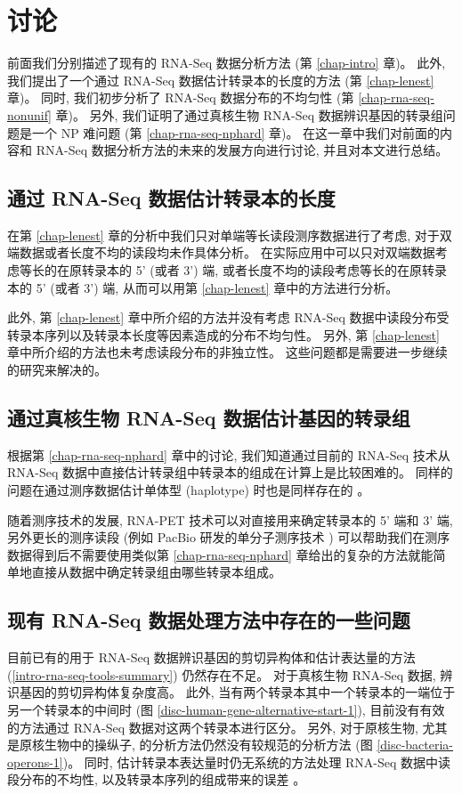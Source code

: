 \chapter{讨论}
前面我们分别描述了现有的 RNA-Seq 数据分析方法 (第 \ref{chap-intro} 章)。 
此外, 我们提出了一个通过 RNA-Seq 数据估计转录本的长度的方法 (第 \ref{chap-lenest} 章)。  
同时, 我们初步分析了 RNA-Seq 数据分布的不均匀性 (第 \ref{chap-rna-seq-nonunif} 章)。  
另外, 我们证明了通过真核生物 RNA-Seq 数据辨识基因的转录组问题是一个 NP 难问题 (第 \ref{chap-rna-seq-nphard} 章)。   
在这一章中我们对前面的内容和 RNA-Seq 数据分析方法的未来的发展方向进行讨论, 
并且对本文进行总结。 

\section{通过 RNA-Seq 数据估计转录本的长度}
在第 \ref{chap-lenest} 章的分析中我们只对单端等长读段测序数据进行了考虑, 
对于双端数据或者长度不均的读段均未作具体分析。 
在实际应用中可以只对双端数据考虑等长的在原转录本的 5' (或者 3') 端, 
或者长度不均的读段考虑等长的在原转录本的 5' (或者 3') 端, 
从而可以用第 \ref{chap-lenest} 章中的方法进行分析。 

此外, 第 \ref{chap-lenest} 章中所介绍的方法并没有考虑 RNA-Seq 
数据中读段分布受转录本序列以及转录本长度等因素造成的分布不均匀性。 
另外, 第 \ref{chap-lenest} 章中所介绍的方法也未考虑读段分布的非独立性。 
这些问题都是需要进一步继续的研究来解决的。 

\section{通过真核生物 RNA-Seq 数据估计基因的转录组}
根据第 \ref{chap-rna-seq-nphard} 章中的讨论, 
我们知道通过目前的 RNA-Seq 技术从 RNA-Seq 数据中直接估计转录组中转录本的组成在计算上是比较困难的。 
同样的问题在通过测序数据估计单体型 (haplotype) 
\cite{Li_Kim_Waterman_2004, Xing_Jordan_Sharan_2007} 时也是同样存在的 \cite{1668028}。 

随着测序技术的发展, 
RNA-PET \cite{Fullwood01042009} 技术可以对直接用来确定转录本的 5' 端和 3' 端, 
另外更长的测序读段 (例如 PacBio 研发的单分子测序技术 \cite{hybrid.rna.seq.2012})
可以帮助我们在测序数据得到后不需要使用类似第 \ref{chap-rna-seq-nphard} 
章给出的复杂的方法就能简单地直接从数据中确定转录组由哪些转录本组成。 

\section{现有 RNA-Seq 数据处理方法中存在的一些问题}
目前已有的用于 RNA-Seq 数据辨识基因的剪切异构体和估计表达量的方法 
(\ref{intro-rna-seq-tools-summary}) 仍然存在不足。 
对于真核生物 RNA-Seq 数据, 辨识基因的剪切异构体复杂度高。
此外, 当有两个转录本其中一个转录本的一端位于另一个转录本的中间时 
(图 \ref{disc-human-gene-alternative-start-1}), 
目前没有有效的方法通过 RNA-Seq 数据对这两个转录本进行区分。
另外, 对于原核生物, 尤其是原核生物中的操纵子, 的分析方法仍然没有较规范的分析方法 
\cite{mcclure2013computational} (图 \ref{disc-bacteria-operons-1})。
同时, 估计转录本表达量时仍无系统的方法处理 RNA-Seq 数据中读段分布的不均性, 
以及转录本序列的组成带来的误差 \cite{oshlack2009transcript, jones2012new}。


